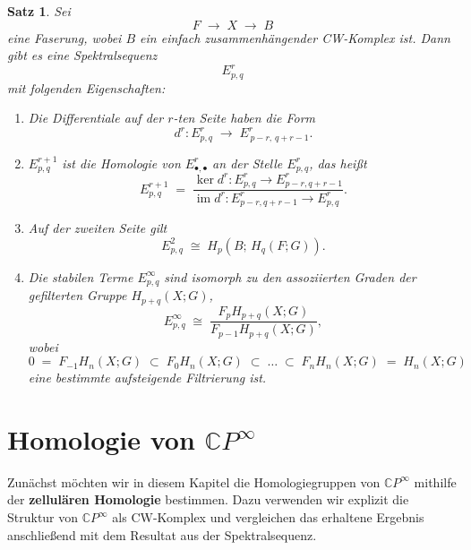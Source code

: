 \documentclass[12pt]{article}
\numberwithin{conj}{section}
\newtheorem{theorem}[conj]{Satz}
\begin{document}
    \begin{theorem}
        {\cite[Proposition 4E.1]{hatcher2001}} \label{SerreSpectralSequence} Sei
        \[
            F \;\longrightarrow\; X \;\longrightarrow\; B
        \]
        eine Faserung, wobei $B$ ein einfach zusammenhängender CW-Komplex ist. Dann gibt
        es eine Spektralsequenz
        \[
            E^{r}_{p,q}
        \]
        mit folgenden Eigenschaften:
        \begin{enumerate}[label=(\alph{*})]
            \item Die Differentiale auf der $r$-ten Seite haben die Form
                \[
                    d^{r} : E^{r}_{p,q}\;\longrightarrow\; E^{r}_{\,p-r,\,q+r-1}.
                \]

            \item $E^{r+1}_{p,q}$ ist die Homologie von $E^{r}_{\bullet,\bullet}$ an der
                Stelle $E^{r}_{p,q}$, das heißt
                \[
                    E^{r+1}_{p,q}\;=\; \frac{\ker d^{r} : E^{r}_{p,q}\to E^{r}_{p-r,q+r-1} }{\mathrm{im} \; d^{r}
                    : E^{r}_{p-r,q+r-1}\to E^{r}_{p,q} }.
                \]

            \item Auf der zweiten Seite gilt
                \[
                    E^{2}_{p,q}\;\cong\; H_{p}(B;\,H_{q}(F;G)).
                \]

            \item Die stabilen Terme $E^{\infty}_{p,q}$ sind isomorph zu den assoziierten
                Graden der gefilterten Gruppe $H_{p+q}(X;G)$,
                \[
                    E^{\infty}_{p,q}\;\cong\; \frac{F_{p}H_{p+q}(X;G)}{F_{p-1}H_{p+q}(X;G)}
                    ,
                \]
                wobei
                \[
                    0 \;=\; F_{-1}H_{n}(X;G) \;\subset\; F_{0}H_{n}(X;G) \;\subset\; \dots
                    \;\subset\; F_{n}H_{n}(X;G) \;=\; H_{n}(X;G)
                \]
                eine bestimmte aufsteigende Filtrierung ist.
        \end{enumerate}
    \end{theorem}

    \section{Homologie von $\mathbb{C}P^{\infty}$}
    \noindent
    Zunächst möchten wir in diesem Kapitel die Homologiegruppen von $\mathbb{C}P^{\infty}$
    mithilfe der \textbf{zellulären Homologie} bestimmen. Dazu verwenden wir explizit
    die Struktur von $\mathbb{C}P^{\infty}$ als CW-Komplex und vergleichen das erhaltene
    Ergebnis anschließend mit dem Resultat aus der Spektralsequenz.
\end{document}
